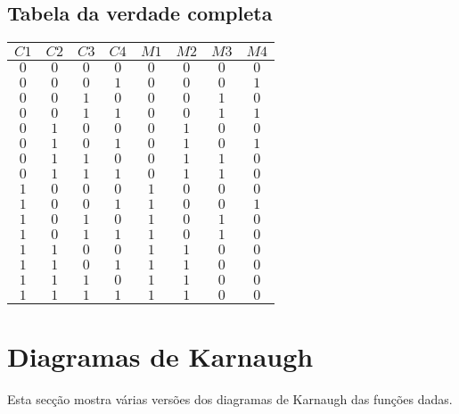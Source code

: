 \documentclass [15pt,a4paper,twoside]{article}
\begin{document}
\subsection{Tabela da verdade completa}
\begin{center}
\begin{tabular}{cccc|cccc}
$C1$&$C2$&$C3$&$C4$&$M1$&$M2$&$M3$&$M4$\\
\hline
$0$&$0$&$0$&$0$&$0$&$0$&$0$&$0$\\
$0$&$0$&$0$&$1$&$0$&$0$&$0$&$1$\\
$0$&$0$&$1$&$0$&$0$&$0$&$1$&$0$\\
$0$&$0$&$1$&$1$&$0$&$0$&$1$&$1$\\
$0$&$1$&$0$&$0$&$0$&$1$&$0$&$0$\\
$0$&$1$&$0$&$1$&$0$&$1$&$0$&$1$\\
$0$&$1$&$1$&$0$&$0$&$1$&$1$&$0$\\
$0$&$1$&$1$&$1$&$0$&$1$&$1$&$0$\\
$1$&$0$&$0$&$0$&$1$&$0$&$0$&$0$\\
$1$&$0$&$0$&$1$&$1$&$0$&$0$&$1$\\
$1$&$0$&$1$&$0$&$1$&$0$&$1$&$0$\\
$1$&$0$&$1$&$1$&$1$&$0$&$1$&$0$\\
$1$&$1$&$0$&$0$&$1$&$1$&$0$&$0$\\
$1$&$1$&$0$&$1$&$1$&$1$&$0$&$0$\\
$1$&$1$&$1$&$0$&$1$&$1$&$0$&$0$\\
$1$&$1$&$1$&$1$&$1$&$1$&$0$&$0$\\

\end{tabular}
\end{center}
\section{Diagramas de Karnaugh}
Esta secção mostra várias versões dos diagramas de Karnaugh das funções dadas.
\end{document}
